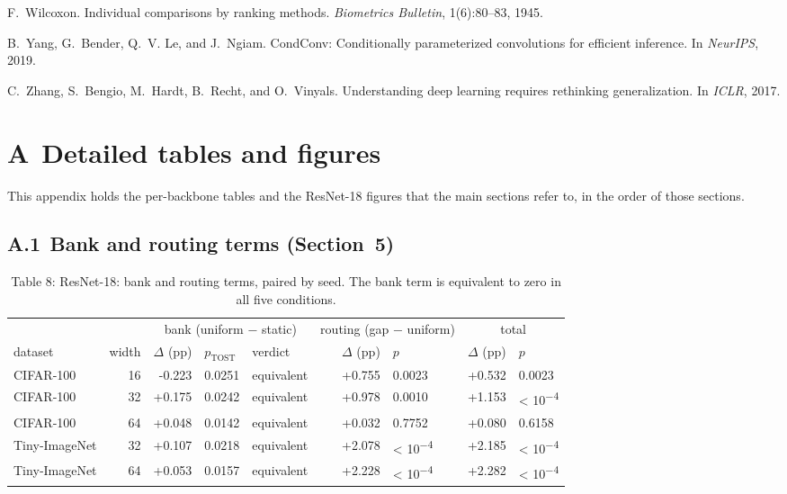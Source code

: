 \documentclass{article}
\begin{document}
F.~Wilcoxon. Individual comparisons by ranking methods. \emph{Biometrics Bulletin}, 1(6):80--83, 1945.

B.~Yang, G.~Bender, Q.~V. Le, and J.~Ngiam. CondConv: Conditionally parameterized convolutions for efficient inference. In \emph{NeurIPS}, 2019.

C.~Zhang, S.~Bengio, M.~Hardt, B.~Recht, and O.~Vinyals. Understanding deep learning requires rethinking generalization. In \emph{ICLR}, 2017.





\section*{A Detailed tables and figures}

This appendix holds the per-backbone tables and the ResNet-18 figures
that the main sections refer to, in the order of those sections.

\subsection*{A.1 Bank and routing terms (Section~5)}

\begin{table}
\caption{Table 8: ResNet-18: bank and routing terms, paired by seed. The bank
term is equivalent to zero in all five conditions.}

\begin{tabular}{l r rll rl rl}
\toprule
& & \multicolumn{3}{c}{bank (uniform − static)}
& \multicolumn{2}{c}{routing (gap − uniform)}
& \multicolumn{2}{c}{total} \\

dataset & width & $\Delta$ (pp) & $p_{\text{TOST}}$ & verdict & $\Delta$ (pp) & $p$ & $\Delta$ (pp) & $p$ \\
\midrule
CIFAR‑100 & 16 & -0.223 & 0.0251 & equivalent & +0.755 & 0.0023 & +0.532 & 0.0023 \\
CIFAR‑100 & 32 & +0.175 & 0.0242 & equivalent & +0.978 & 0.0010 & +1.153 & < 10\textsuperscript{−4} \\
CIFAR‑100 & 64 & +0.048 & 0.0142 & equivalent & +0.032 & 0.7752 & +0.080 & 0.6158 \\
Tiny‑ImageNet & 32 & +0.107 & 0.0218 & equivalent & +2.078 & < 10\textsuperscript{−4} & +2.185 & < 10\textsuperscript{−4} \\
Tiny‑ImageNet & 64 & +0.053 & 0.0157 & equivalent & +2.228 & < 10\textsuperscript{−4} & +2.282 & < 10\textsuperscript{−4} \\
\bottomrule
\end{tabular}
\end{table}
\end{document}
